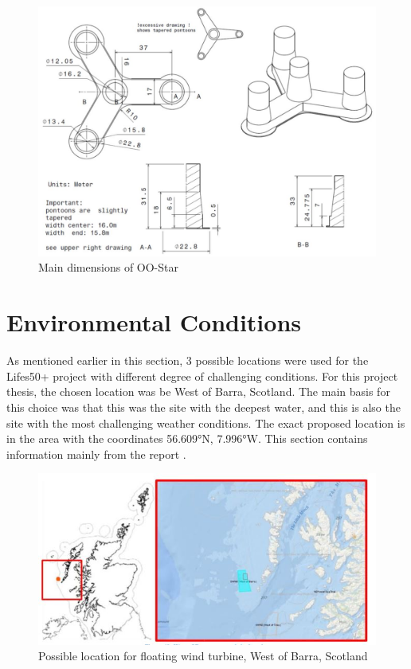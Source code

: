 \begin{figure}[H]
\centering
\includegraphics[scale=0.6]{figures/designoostar}
\caption[$\; \:$Main dimensions of OO-Star]{Main dimensions of OO-Star \cite{Lifes50+D4.2} }
 \label{fig:designoostar}
\end{figure}

\section{Environmental Conditions}
As mentioned earlier in this section, 3 possible locations were used for the Lifes50+ project with different degree of challenging conditions. For this project thesis, the chosen location was be West of Barra, Scotland. The main basis for this choice was that this was the site with the deepest water, and this is also the site with the most challenging weather conditions. The exact proposed location is in the area with the coordinates 56.609°N, 7.996°W.  This section contains information mainly from the report \cite{Lifes50+D1.1}.


\begin{figure}[H]
\centering
\includegraphics[scale=0.8]{figures/wob}
\caption[$\; \:$West of Barra, Scotland]{Possible location for floating wind turbine, West of Barra, Scotland \cite{Lifes50+D1.1} }
 \label{fig:wob}
\end{figure}

